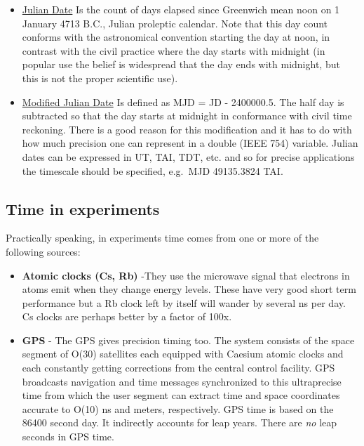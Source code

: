 \documentclass[
  letterpaper,
  DIV=11,
  numbers=noendperiod]{scrreprt}
\begin{document}
\begin{itemize}
\item
  \href{http://en.wikipedia.org/wiki/Julian_day}{Julian Date} Is the
  count of days elapsed since Greenwich mean noon on 1 January 4713
  B.C., Julian proleptic calendar. Note that this day count conforms
  with the astronomical convention starting the day at noon, in contrast
  with the civil practice where the day starts with midnight (in popular
  use the belief is widespread that the day ends with midnight, but this
  is not the proper scientific use).
\item
  \href{http://en.wikipedia.org/wiki/Julian_day}{Modified Julian Date}
  Is defined as MJD = JD - 2400000.5. The half day is subtracted so that
  the day starts at midnight in conformance with civil time reckoning.
  There is a good reason for this modification and it has to do with how
  much precision one can represent in a double (IEEE 754) variable.
  Julian dates can be expressed in UT, TAI, TDT, etc. and so for precise
  applications the timescale should be specified, e.g.~MJD 49135.3824
  TAI.
\end{itemize}

\subsection*{Time in experiments}\label{time-in-experiments}

Practically speaking, in experiments time comes from one or more of the
following sources:

\begin{itemize}
\item
  \textbf{Atomic clocks (Cs, Rb)} -They use the microwave signal that
  electrons in atoms emit when they change energy levels. These have
  very good short term performance but a Rb clock left by itself will
  wander by several ns per day. Cs clocks are perhaps better by a factor
  of 100x.
\item
  \textbf{GPS} - The GPS gives precision timing too. The system consists
  of the space segment of O(30) satellites each equipped with Caesium
  atomic clocks and each constantly getting corrections from the central
  control facility. GPS broadcasts navigation and time messages
  synchronized to this ultraprecise time from which the user segment can
  extract time and space coordinates accurate to O(10) ns and meters,
  respectively. GPS time is based on the 86400 second day. It indirectly
  accounts for leap years. There are \emph{no} leap seconds in GPS time.
\end{itemize}
\end{document}
